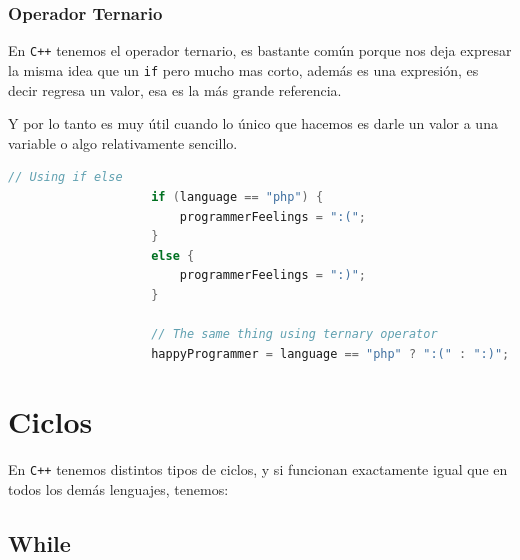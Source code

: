 \documentclass[12pt, fleqn]{report}                             %
\theoremstyle{break}                                            %
\newcommand \Cpp  {\texttt{C++} }                               %
\begin{document}
                \subsubsection{Operador Ternario}

                En \Cpp tenemos el operador ternario, es bastante común porque nos deja expresar la misma
                idea que un \texttt{if} pero mucho mas corto, además es una expresión, es decir
                regresa un valor, esa es la más grande referencia.

                Y por lo tanto es muy útil cuando lo único que hacemos es darle un valor a una variable
                o algo relativamente sencillo.

                \begin{lstlisting}[language=C++, gobble=20]
                    // Using if else
                    if (language == "php") {
                        programmerFeelings = ":(";
                    }
                    else {
                        programmerFeelings = ":)";
                    }

                    // The same thing using ternary operator
                    happyProgrammer = language == "php" ? ":(" : ":)";
                \end{lstlisting}
                
        \clearpage
        \section{Ciclos}
            
            En \Cpp tenemos distintos tipos de ciclos, y si funcionan exactamente igual que
            en todos los demás lenguajes, tenemos:

            
            \subsection{While}
\end{document}
